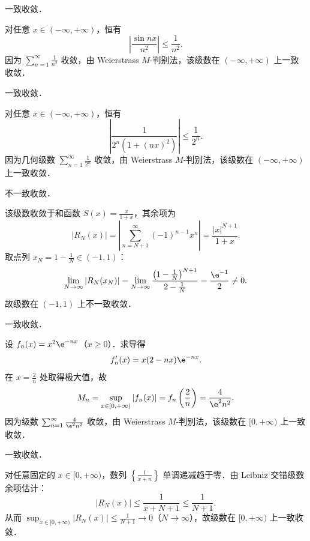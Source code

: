 \begin{solution}
     一致收敛．

    对任意 $x \in (-\infty, +\infty)$，恒有
    \begin{equation}
        \left| \frac{\sin nx}{n^2} \right| \leqslant \frac{1}{n^2}.
    \end{equation}
    因为 $\sum_{n=1}^\infty \frac{1}{n^2}$ 收敛，由 Weierstrass $M$-判别法，该级数在 $(-\infty, +\infty)$ 上一致收敛．

     一致收敛．

    对任意 $x \in (-\infty, +\infty)$，恒有
    \begin{equation}
        \left| \frac{1}{2^n(1 + (nx)^2)} \right| \leqslant \frac{1}{2^n}.
    \end{equation}
    因为几何级数 $\sum_{n=1}^\infty \frac{1}{2^n}$ 收敛，由 Weierstrass $M$-判别法，该级数在 $(-\infty, +\infty)$ 上一致收敛．

     不一致收敛．

    该级数收敛于和函数 $S(x) = \frac{x}{1 + x}$，其余项为
    \begin{equation}
        |R_N(x)| = \left| \sum_{n=N+1}^\infty (-1)^{n-1} x^n \right| = \frac{|x|^{N+1}}{1 + x}.
    \end{equation}
    取点列 $x_N = 1 - \frac{1}{N} \in (-1, 1)$：
    \begin{equation}
        \lim_{N\to\infty} |R_N(x_N)| = \lim_{N\to\infty} \frac{\left(1 - \frac{1}{N}\right)^{N+1}}{2 - \frac{1}{N}} = \frac{\e^{-1}}{2} \neq 0.
    \end{equation}
    故级数在 $(-1, 1)$ 上不一致收敛．

     一致收敛．

    设 $f_n(x) = x^2 \e^{-nx}$（$x \geqslant 0$）．求导得
    \begin{equation}
        f_n'(x) = x(2 - nx)\e^{-nx}.
    \end{equation}
    在 $x = \frac{2}{n}$ 处取得极大值，故
    \begin{equation}
        M_n = \sup_{x \in [0, +\infty)} |f_n(x)| = f_n\left(\frac{2}{n}\right) = \frac{4}{\e^2 n^2}.
    \end{equation}
    因为级数 $\sum_{n=1}^\infty \frac{4}{\e^2 n^2}$ 收敛，由 Weierstrass $M$-判别法，该级数在 $[0, +\infty)$ 上一致收敛．

     一致收敛．

    对任意固定的 $x \in [0, +\infty)$，数列 $\left\{\frac{1}{x + n}\right\}$ 单调递减趋于零．由 Leibniz 交错级数余项估计：
    \begin{equation}
        |R_N(x)| \leqslant \frac{1}{x + N + 1} \leqslant \frac{1}{N + 1}.
    \end{equation}
    从而 $\sup_{x \in [0, +\infty)} |R_N(x)| \leqslant \frac{1}{N + 1} \to 0$（$N \to \infty$），故级数在 $[0, +\infty)$ 上一致收敛．


\end{solution}
